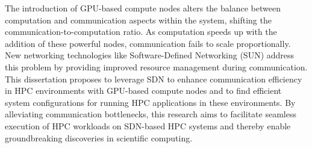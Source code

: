 The introduction of
GPU-based compute nodes
alters the balance between computation and communication aspects within the
system, shifting the communication-to-computation ratio.
As computation speeds up with the addition of these powerful
nodes, communication fails to scale proportionally. New networking
technologies like Software-Defined Networking (SUN) address
this problem by providing
improved resource management during communication.
This dissertation proposes to leverage SDN to enhance
communication efficiency in HPC environments with GPU-based compute nodes
and to find efficient system configurations for running
HPC applications in these environments. By alleviating communication
bottlenecks, this research aims to facilitate seamless execution of HPC
workloads on SDN-based HPC systems and thereby enable groundbreaking discoveries in scientific computing.
